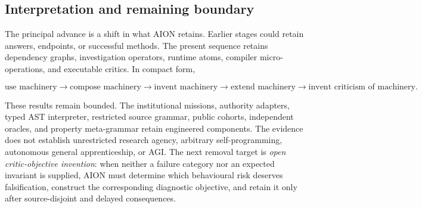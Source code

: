 \subsection{Interpretation and remaining boundary}
\label{subsec:recursive-invention-boundary}

The principal advance is a shift in what AION retains.  Earlier stages could
retain answers, endpoints, or successful methods.  The present sequence retains
dependency graphs, investigation operators, runtime atoms, compiler
micro-operations, and executable critics.  In compact form,

\begin{equation}
\text{use machinery}
\rightarrow \text{compose machinery}
\rightarrow \text{invent machinery}
\rightarrow \text{extend machinery}
\rightarrow \text{invent criticism of machinery}.
\end{equation}

These results remain bounded.  The institutional missions, authority adapters,
typed AST interpreter, restricted source grammar, public cohorts, independent
oracles, and property meta-grammar retain engineered components.  The evidence
does not establish unrestricted research agency, arbitrary self-programming,
autonomous general apprenticeship, or AGI.  The next removal target is
\emph{open critic-objective invention}: when neither a failure category nor an
expected invariant is supplied, AION must determine which behavioural risk
deserves falsification, construct the corresponding diagnostic objective, and
retain it only after source-disjoint and delayed consequences.

